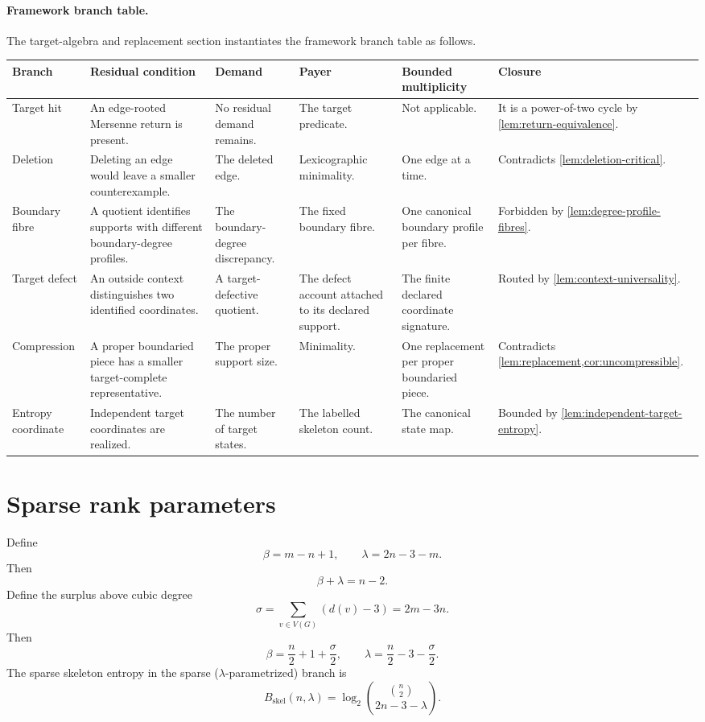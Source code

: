 \documentclass[11pt]{article}
\newcommand{\FrameworkBranchTableHeader}{%
\toprule
\textbf{Branch} & \textbf{Residual condition} & \textbf{Demand} & \textbf{Payer} & \textbf{Bounded multiplicity} & \textbf{Closure}\\
\midrule
}
\begin{document}
\paragraph{Framework branch table.}
The target-algebra and replacement section instantiates the framework branch
table as follows.
\begin{longtable}{L{0.13\textwidth} L{0.19\textwidth} L{0.14\textwidth} L{0.14\textwidth} L{0.17\textwidth} L{0.17\textwidth}}
\FrameworkBranchTableHeader
Target hit
&
An edge-rooted Mersenne return is present.
&
No residual demand remains.
&
The target predicate.
&
Not applicable.
&
It is a power-of-two cycle by \cref{lem:return-equivalence}.
\\
\addlinespace
Deletion
&
Deleting an edge would leave a smaller counterexample.
&
The deleted edge.
&
Lexicographic minimality.
&
One edge at a time.
&
Contradicts \cref{lem:deletion-critical}.
\\
\addlinespace
Boundary fibre
&
A quotient identifies supports with different boundary-degree profiles.
&
The boundary-degree discrepancy.
&
The fixed boundary fibre.
&
One canonical boundary profile per fibre.
&
Forbidden by \cref{lem:degree-profile-fibres}.
\\
\addlinespace
Target defect
&
An outside context distinguishes two identified coordinates.
&
A target-defective quotient.
&
The defect account attached to its declared support.
&
The finite declared coordinate signature.
&
Routed by \cref{lem:context-universality}.
\\
\addlinespace
Compression
&
A proper boundaried piece has a smaller target-complete representative.
&
The proper support size.
&
Minimality.
&
One replacement per proper boundaried piece.
&
Contradicts \cref{lem:replacement,cor:uncompressible}.
\\
\addlinespace
Entropy coordinate
&
Independent target coordinates are realized.
&
The number of target states.
&
The labelled skeleton count.
&
The canonical state map.
&
Bounded by \cref{lem:independent-target-entropy}.
\\
\bottomrule
\end{longtable}

\section{Sparse rank parameters}

Define
\[
\beta=m-n+1,
\qquad
\lambda=2n-3-m.
\]
Then
\[
\boxed{\beta+\lambda=n-2.}
\]
Define the surplus above cubic degree
\[
\sigma=\sum_{v\in V(G)}(d(v)-3)=2m-3n.
\]
Then
\[
\boxed{\beta=\frac n2+1+\frac{\sigma}{2}},
\qquad
\boxed{\lambda=\frac n2-3-\frac{\sigma}{2}}.
\]
The sparse skeleton entropy in the sparse ($\lambda$-parametrized) branch is
\[
B_{\mathrm{skel}}(n,\lambda)=\log_2\binom{\binom n2}{2n-3-\lambda}.
\]
\end{document}
